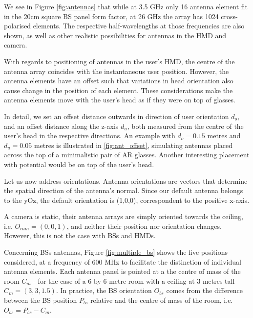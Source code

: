 
We see in Figure \ref{fig:antennas} that while at 3.5 GHz only 16 antenna element fit in the 20cm square \ac{BS} panel form factor, at 26 GHz the array has 1024 cross-polarised elements. The respective half-wavelengths at those frequencies are also shown, as well as other realistic possibilities for antennas in the \ac{HMD} and camera.

With regards to positioning of antennas in the user's \ac{HMD}, the centre of the antenna array coincides with the instantaneous user position. However, the antenna elements have an offset such that variations in head orientation also cause change in the position of each element. These considerations make the antenna elements move with the user's head as if they were on top of glasses.

In detail, we set an offset distance outwards in direction of user orientation $d_{o}$, and an offset distance along the z-axis $d_{u}$, both measured from the centre of the user's head in the respective directions. An example with $d_{o} = 0.15$ metres and $d_{u} = 0.05$ metres is illustrated in \ref{fig:ant_offset}, simulating antennas placed across the top of a minimalistic pair of \ac{AR} glasses. Another interesting placement with potential would be on top of the user's head.


Let us now address orientations. Antenna orientations are vectors that determine the spatial direction of the antenna's normal. Since our default antenna belongs to the yOz, the default orientation is (1,0,0), correspondent to the positive x-axis. 

A camera is static, their antenna arrays are simply oriented towards the ceiling, i.e. $O_{cam} = (0,0,1)$, and neither their position nor orientation changes. However, this is not the case with \acp{BS} and \acp{HMD}. 

Concerning \acsp{BS} antennas, Figure \ref{fig:multiple_bs} shows the five positions considered, at a frequency of 600 MHz to facilitate the distinction of individual antenna elements. Each antenna panel is pointed at a the centre of mass of the room $C_m$ - for the case of a 6 by 6 metre room with a ceiling at 3 metres tall $C_m = (3, 3, 1.5)$. In practice, the BS orientation $O_{bs}$ comes from the difference between the BS position $P_{bs}$ relative and the centre of mass of the room, i.e. $O_{bs} = P_{bs} - C_m$.

